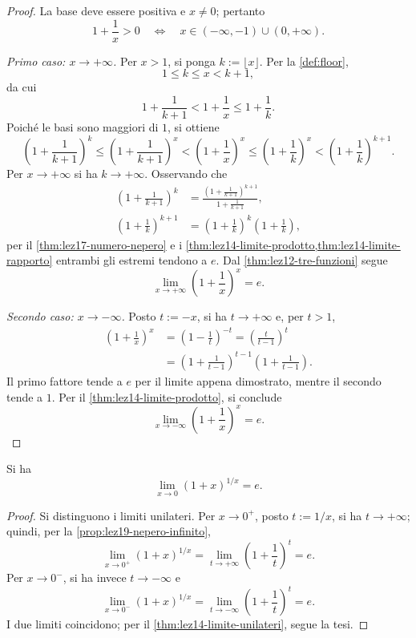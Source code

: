 \begin{proof}
La base deve essere positiva e \(x\ne0\); pertanto
\[
  1+\frac1x>0
  \quad\Longleftrightarrow\quad
  x\in(-\infty,-1)\cup(0,+\infty).
\]

\emph{Primo caso: \(x\to+\infty\).}
Per \(x>1\), si ponga \(k:=\lfloor x\rfloor\).
Per la \cref{def:floor},
\[
  1\le k\le x<k+1,
\]
da cui
\[
  1+\frac1{k+1}<1+\frac1x\le1+\frac1k.
\]
Poiché le basi sono maggiori di \(1\), si ottiene
\[
  \left(1+\frac1{k+1}\right)^k
  \le\left(1+\frac1{k+1}\right)^x
  <\left(1+\frac1x\right)^x
  \le\left(1+\frac1k\right)^x
  <\left(1+\frac1k\right)^{k+1}.
\]
Per \(x\to+\infty\) si ha \(k\to+\infty\).
Osservando che
\[
\begin{aligned}
  \left(1+\frac1{k+1}\right)^k
    &=\frac{\left(1+\frac1{k+1}\right)^{k+1}}
            {1+\frac1{k+1}},\\[4pt]
  \left(1+\frac1k\right)^{k+1}
    &=\left(1+\frac1k\right)^k
      \left(1+\frac1k\right),
\end{aligned}
\]
per il \cref{thm:lez17-numero-nepero} e i
\cref{thm:lez14-limite-prodotto,thm:lez14-limite-rapporto}
entrambi gli estremi tendono a \(e\).
Dal \cref{thm:lez12-tre-funzioni} segue
\[
  \lim_{x\to+\infty}\left(1+\frac1x\right)^x=e.
\]

\emph{Secondo caso: \(x\to-\infty\).}
Posto \(t:=-x\), si ha \(t\to+\infty\) e, per \(t>1\),
\[
\begin{aligned}
  \left(1+\frac1x\right)^x
  &=\left(1-\frac1t\right)^{-t}
   =\left(\frac{t}{t-1}\right)^t\\
  &=\left(1+\frac1{t-1}\right)^{t-1}
    \left(1+\frac1{t-1}\right).
\end{aligned}
\]
Il primo fattore tende a \(e\) per il limite
appena dimostrato, mentre il secondo tende a \(1\).
Per il \cref{thm:lez14-limite-prodotto},
si conclude
\[
  \lim_{x\to-\infty}\left(1+\frac1x\right)^x=e.
\]
\end{proof}

\begin{proposition}
\label{prop:lez19-nepero-zero}
Si ha
\[
  \lim_{x\to0}(1+x)^{1/x}=e.
\]
\end{proposition}

\begin{proof}
Si distinguono i limiti unilateri.
Per \(x\to0^+\), posto \(t:=1/x\), si ha
\(t\to+\infty\); quindi, per la
\cref{prop:lez19-nepero-infinito},
\[
  \lim_{x\to0^+}(1+x)^{1/x}
  =\lim_{t\to+\infty}\left(1+\frac1t\right)^t=e.
\]
Per \(x\to0^-\), si ha invece \(t\to-\infty\) e
\[
  \lim_{x\to0^-}(1+x)^{1/x}
  =\lim_{t\to-\infty}\left(1+\frac1t\right)^t=e.
\]
I due limiti coincidono; per il
\cref{thm:lez14-limite-unilateri}, segue la tesi.
\end{proof}

